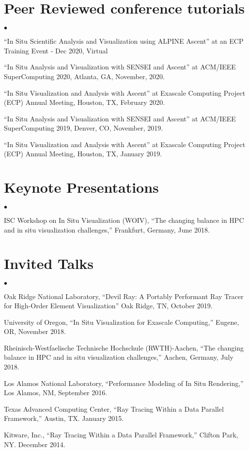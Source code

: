 \documentclass[margin,line]{res}
\newenvironment{list2}{
  \begin{list}{$\bullet$}{%
      \setlength{\itemsep}{0in}
      \setlength{\parsep}{0in} \setlength{\parskip}{0in}
      \setlength{\topsep}{0in} \setlength{\partopsep}{0in}
      \setlength{\leftmargin}{0.2in}}}{\end{list}}
\begin{document}
\begin{resume}
\section{\sc Peer Reviewed conference tutorials}
\begin{list2}
  \item ``In Situ Scientific Analysis and Visualization using ALPINE Ascent'' at an ECP Training Event - Dec 2020, Virtual
	\item ``In Situ Analysis and Visualization with SENSEI and Ascent'' at ACM/IEEE SuperComputing 2020, Atlanta, GA, November, 2020.
	\item ``In Situ Visualization and Analysis with Ascent'' at Exascale Computing Project (ECP) Annual
	Meeting, Houston, TX, February 2020.
	\item ``In Situ Analysis and Visualization with SENSEI and Ascent'' at ACM/IEEE SuperComputing 2019, Denver, CO, November, 2019.
	\item ``In Situ Visualization and Analysis with Ascent'' at Exascale Computing Project (ECP) Annual
	Meeting, Houston, TX, January 2019.
\end{list2}

\section{\sc Keynote Presentations}
\begin{list2}
	\item ISC Workshop on In Situ Visualization (WOIV), ``The changing balance in HPC and in situ visualization challenges,''  Frankfurt, Germany, June 2018.
\end{list2}
\section{\sc Invited Talks}
\begin{list2}
	\item Oak Ridge National Laboratory, ``Devil Ray: A Portably Performant Ray Tracer for High-Order Element Visualization'' Oak Ridge, TN, October 2019.
	\item University of Oregon, ``In Situ Visualization for Exascale Computing,'' Eugene, OR, November 2018.
	\item Rheinisch-Westfaelische Technische Hochschule (RWTH)-Aachen, ``The changing balance in HPC and in situ visualization challenges,'' Aachen, Germany, July 2018.
	\item Los Alamos National Laboratory, “Performance Modeling of In Situ Rendering,” Los Alamos, NM, September 2016.
	\item Texas Advanced Computing Center, ``Ray Tracing Within a Data Parallel Framework,'' Austin, TX. January 2015.
	\item  Kitware, Inc., ``Ray Tracing Within a Data Parallel Framework,'' Clifton Park, NY. December 2014.
\end{list2}

\end{resume}
\end{document}
